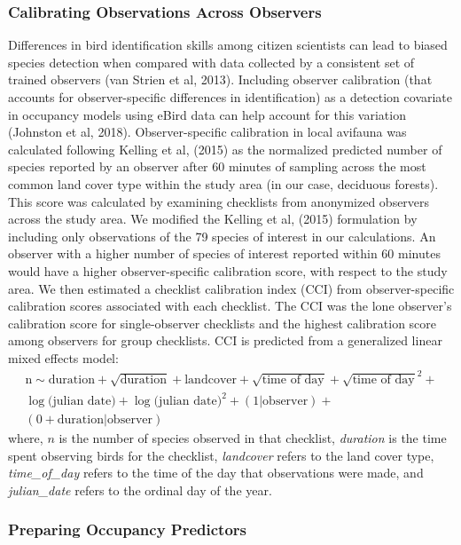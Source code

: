 \subsubsection*{Calibrating Observations Across Observers}

Differences in bird identification skills among citizen scientists can lead to biased species detection when compared with data collected by a consistent set of trained observers (van Strien et al, 2013).
Including observer calibration (that accounts for observer-specific differences in identification) as a detection covariate in occupancy models using eBird data can help account for this variation (Johnston et al, 2018).
Observer-specific calibration in local avifauna was calculated following Kelling et al, (2015) as the normalized predicted number of species reported by an observer after 60 minutes of sampling across the most common land cover type within the study area (in our case, deciduous forests).
This score was calculated by examining checklists from anonymized observers across the study area.
We modified the Kelling et al, (2015) formulation by including only observations of the 79 species of interest in our calculations.
An observer with a higher number of species of interest reported within 60 minutes would have a higher observer-specific calibration score, with respect to the study area.
We then estimated a checklist calibration index (CCI) from observer-specific calibration scores associated with each checklist.
The CCI was the lone observer's calibration score for single-observer checklists and the highest calibration score among observers for group checklists.
CCI is predicted from a generalized linear mixed effects model:
\begin{multline*}
    \text{n} \sim \text{duration} + \sqrt{\text{duration}} + \text{landcover} + \sqrt{\text{time of day}} + \sqrt{\text{time of day}}^2 + \\ \log({\text{julian date})} + \log({\text{julian date})}^2 + (1 | \text{observer}) + \\(0 + \text{duration} | \text{observer})
\end{multline*}
where, $n$ is the number of species observed in that checklist, \textit{duration} is the time spent observing birds for the checklist, \textit{landcover} refers to the land cover type, \textit{time\_of\_day} refers to the time of the day that observations were made, and \textit{julian\_date} refers to the ordinal day of the year.

\subsubsection*{Preparing Occupancy Predictors}

